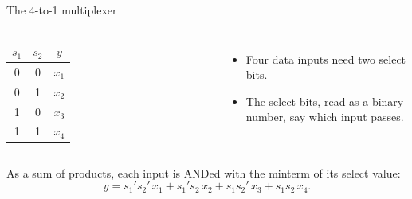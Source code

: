 \documentclass[10pt]{wosm-slides}
\newcommand*\buswidth[3][above]{%
  \draw[wire] ($(#2)+(-0.08,-0.12)$) -- ($(#2)+(0.08,0.12)$);
  \node[edgelabel, #1=2pt] at (#2) {#3};}
\begin{document}
\begin{frame}{The 4-to-1 multiplexer}
  \begin{columns}[c, totalwidth=\textwidth]
      \centering
      \begin{tabular}{@{}cc|c@{}}
        $s_1$ & $s_2$ & $y$ \\
        \midrule
        0 & 0 & $x_1$ \\
        0 & 1 & $x_2$ \\
        1 & 0 & $x_3$ \\
        1 & 1 & $x_4$ \\
      \end{tabular}
      \centering
      \begin{itemize}
        \item Four data inputs need two select bits.
        \item The select bits, read as a binary number, say which input passes.
      \end{itemize}
  \end{columns}

  \medskip
  As a sum of products, each input is ANDed with the minterm of its select value:
  \[ y = s_1's_2'\,x_1 + s_1's_2\,x_2 + s_1s_2'\,x_3 + s_1s_2\,x_4 . \]
\end{frame}
\end{document}
